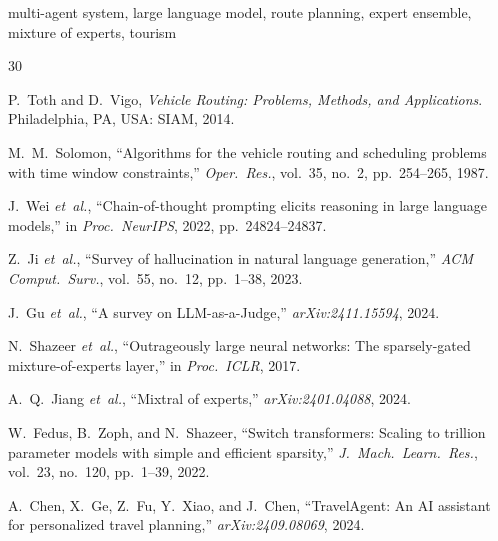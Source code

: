 \documentclass[journal]{IEEEtran}
\begin{document}
\begin{IEEEkeywords}
multi-agent system, large language model, route planning, expert ensemble, mixture of experts, tourism
\end{IEEEkeywords}













\begin{thebibliography}{30}

P.~Toth and D.~Vigo, \emph{Vehicle Routing: Problems, Methods, and Applications}. Philadelphia, PA, USA: SIAM, 2014.

M.~M.~Solomon, ``Algorithms for the vehicle routing and scheduling problems with time window constraints,'' \emph{Oper.\ Res.}, vol.~35, no.~2, pp.~254--265, 1987.

J.~Wei \emph{et~al.}, ``Chain-of-thought prompting elicits reasoning in large language models,'' in \emph{Proc.\ NeurIPS}, 2022, pp.~24824--24837.

Z.~Ji \emph{et~al.}, ``Survey of hallucination in natural language generation,'' \emph{ACM Comput.\ Surv.}, vol.~55, no.~12, pp.~1--38, 2023.

J.~Gu \emph{et~al.}, ``A survey on LLM-as-a-Judge,'' \emph{arXiv:2411.15594}, 2024.

N.~Shazeer \emph{et~al.}, ``Outrageously large neural networks: The sparsely-gated mixture-of-experts layer,'' in \emph{Proc.\ ICLR}, 2017.

A.~Q.~Jiang \emph{et~al.}, ``Mixtral of experts,'' \emph{arXiv:2401.04088}, 2024.

W.~Fedus, B.~Zoph, and N.~Shazeer, ``Switch transformers: Scaling to trillion parameter models with simple and efficient sparsity,'' \emph{J.\ Mach.\ Learn.\ Res.}, vol.~23, no.~120, pp.~1--39, 2022.

A.~Chen, X.~Ge, Z.~Fu, Y.~Xiao, and J.~Chen, ``TravelAgent: An AI assistant for personalized travel planning,'' \emph{arXiv:2409.08069}, 2024.


\end{thebibliography}
\end{document}
